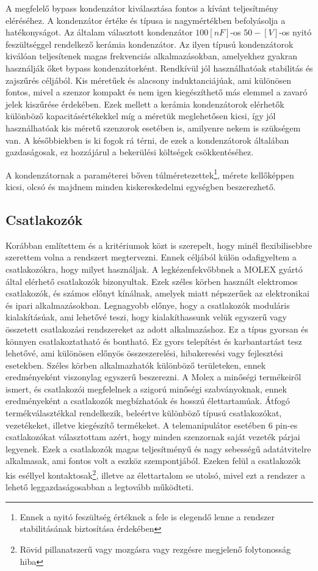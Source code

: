 A megfelelő bypass kondenzátor kiválasztása fontos a kívánt teljesítmény eléréséhez. A kondenzátor értéke és típusa is nagymértékben befolyásolja a hatékonyságot. Az általam választott kondenzátor $100[nF]$-os $50-[V]$-os nyitó feszültséggel rendelkező kerámia kondenzátor. Az ilyen típusú kondenzátorok kiválóan teljesítenek magas frekvenciás alkalmazásokban, amelyekhez gyakran használják őket bypass kondenzátorként. Rendkívül jól használhatóak stabilitás és zajszűrés céljából. Kis méretűek és alacsony induktanciájúak, ami különösen fontos, mivel a szenzor kompakt és nem igen kiegészíthető más elemmel a zavaró jelek kiszűrése érdekében. Ezek mellett a kerámia kondenzátorok elérhetők különböző kapacitásértékekkel míg a méretük meglehetősen kicsi, így jól használhatóak kis méretű szenzorok esetében is, amilyenre nekem is szükségem van. A későbbiekben is ki fogok rá térni, de ezek a kondenzátorok általában gazdaságosak, ez hozzájárul a bekerülési költségek csökkentéséhez.

A kondenzátornak a paraméterei bőven túlméretezettek\footnote{Ennek a nyitó feszültség értéknek a fele is elegendő lenne a rendszer stabilitásának biztosítása érdekében}, mérete kellőképpen kicsi, olcsó és majdnem minden kiskereskedelmi egységben beszerezhető.

\subsection{Csatlakozók}

Korábban említettem és a kritériumok közt is szerepelt, hogy minél flexibilisebbre szerettem volna a rendszert megtervezni. Ennek céljából külön odafigyeltem a csatlakozókra, hogy milyet használjak. A legkézenfekvőbbnek a MOLEX gyártó által elérhető csatlakozók bizonyultak. Ezek széles körben használt elektromos csatlakozók, és számos előnyt kínálnak, amelyek miatt népszerűek az elektronikai és ipari alkalmazásokban. Legnagyobb előnye, hogy a csatlakozók moduláris kialakításúak, ami lehetővé teszi, hogy kialakíthassunk velük egyszerű vagy összetett csatlakozási rendszereket az adott alkalmazáshoz. Ez a típus gyorsan és könnyen csatlakoztatható és bontható. Ez gyors telepítést és karbantartást tesz lehetővé, ami különösen előnyös összeszerelési, hibakeresési vagy fejlesztési esetekben. Széles körben alkalmazhatók különböző területeken, ennek eredményeként viszonylag egyszerű beszerezni. A Molex a minőségi termékeiről ismert, és csatlakozói megfelelnek a szigorú minőségi szabványoknak, ennek eredményeként a csatlakozók megbízhatóak és hosszú élettartamúak. Átfogó termékválasztékkal rendelkezik, beleértve különböző típusú csatlakozókat, vezetékeket, illetve kiegészítő termékeket. A telemanipulátor esetében 6 pin-es csatlakozókat választottam azért, hogy minden szenzornak saját vezeték párjai legyenek. Ezek a csatlakozók magas teljesítményű és nagy sebességű adatátvitelre alkalmasak, ami fontos volt a eszköz szempontjából. Ezeken felül a csatlakozók kis eséllyel kontaktosak\footnote{Rövid pillanatszerű vagy mozgásra vagy rezgésre megjelenő folytonosság hiba}, illetve az élettartalom se utolsó, mivel ezt a rendszer a lehető leggazdaságosabban a legtovább működteti.

